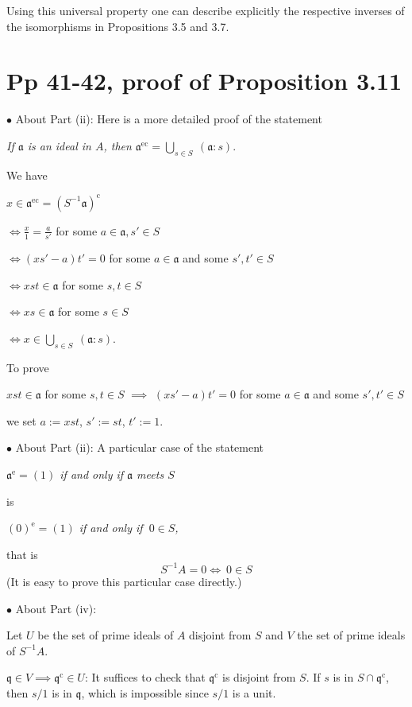 \documentclass[parskip=half]{scrartcl}%
\newcommand{\oo}{\operatorname}
\newcommand{\mf}{\mathfrak}
\newcommand{\bu}{\bullet}
\newcommand{\ds}{\displaystyle}
\begin{document}
Using this universal property one can describe explicitly the respective inverses of the isomorphisms in Propositions 3.5 and 3.7.

\section{Pp 41-42, proof of Proposition 3.11}%

$\bu$ About Part (ii): Here is a more detailed proof of the statement 

\emph{If $\mf a$ is an ideal in $A$, then $\mf a^{\oo{ec}}=\bigcup_{s\in S}\ (\mf a:s)$}.

We have 

$x\in\mf a^{\oo{ec}}=(S^{-1}\mf a)^{\oo c}$

$\ds\iff\frac{x}{1}=\frac{a}{s'}$ for some $a\in\mf a,s'\in S$ 

$\iff(xs'-a)t'=0$ for some $a\in\mf a$ and some $s',t'\in S$ 

$\iff xst\in\mf a$ for some $s,t\in S$

$\iff xs\in\mf a$ for some $s\in S$

$\iff x\in\bigcup_{s\in S}\ (\mf a:s)$.

To prove 

$xst\in\mf a$ for some $s,t\in S$ $\implies$ $(xs'-a)t'=0$ for some $a\in\mf a$ and some $s',t'\in S$

we set $a:=xst$, $s':=st$, $t':=1$.%

$\bu$ About Part (ii): A particular case of the statement 

\emph{$\mf a^{\oo e}=(1)$ if and only if $\mf a$ meets $S$}

is 

\emph{$(0)^{\oo e}=(1)$ if and only if $\ 0\in S$,}

that is 
\begin{equation}\label{s-1a}
S^{-1}A=0\iff\ 0\in S
\end{equation}
(It is easy to prove this particular case directly.)

$\bu$ About Part (iv):

Let $U$ be the set of prime ideals of $A$ disjoint from $S$ and $V$ the set of prime ideals of $S^{-1}A$. 

$\mf q\in V\implies\mf q^{\oo c}\in U$: It suffices to check that $\mf q^{\oo c}$ is disjoint from $S$. If $s$ is in $S\cap\mf q^{\oo c}$, then $s/1$ is in $\mf q$, which is impossible since $s/1$ is a unit.
\end{document}
